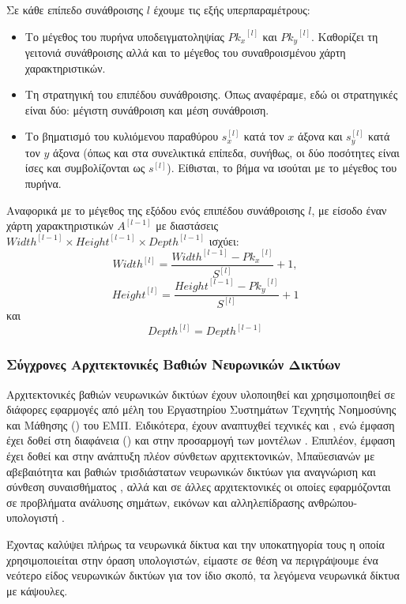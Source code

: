 Σε κάθε επίπεδο συνάθροισης $l$ έχουμε τις εξής υπερπαραμέτρους:
\begin{itemize}
  \item Το μέγεθος του πυρήνα υποδειγματοληψίας ${Pk_x}^{[l]}$ και ${Pk_y}^{[l]}$. Καθορίζει τη γειτονιά συνάθροισης αλλά και το μέγεθος του συναθροισμένου χάρτη χαρακτηριστικών.
  \item Τη στρατηγική του επιπέδου συνάθροισης. Όπως αναφέραμε, εδώ οι στρατηγικές είναι δύο: μέγιστη συνάθροιση και μέση συνάθροιση.
  \item Το βηματισμό του κυλιόμενου παραθύρου $s^{[l]}_x$ κατά τον $x$ άξονα και $s^{[l]}_y$ κατά τον $y$ άξονα (όπως και στα συνελικτικά επίπεδα, συνήθως, οι δύο ποσότητες είναι ίσες και συμβολίζονται ως $s^{[l]}$). Είθισται, το βήμα να ισούται με το μέγεθος του πυρήνα.
\end{itemize}

Αναφορικά με το μέγεθος της εξόδου ενός επιπέδου συνάθροισης $l$, με είσοδο έναν χάρτη χαρακτηριστικών $A^{[l-1]}$ με διαστάσεις ${Width}^{[l-1]} \times {Height}^{[l-1]}\times{Depth}^{[l-1]}$ ισχύει:
\begin{equation}
  {Width}^{[l]}= \frac{{Width}^{[l-1]}-{Pk_x}^{[l]}}{S^{[l]}} + 1,
  \end{equation}
  \begin{equation}
    {Height}^{[l]}=\frac{{Height}^{[l-1]}-{Pk_y}^{[l]}}{S^{[l]}} + 1
  \end{equation}
  και
  \begin{equation}
    {Depth}^{[l]}={Depth}^{[l-1]}
  \end{equation}


\subsubsection{Σύγχρονες Αρχιτεκτονικές Βαθιών Νευρωνικών Δικτύων}

Αρχιτεκτονικές βαθιών νευρωνικών δικτύων έχουν υλοποιηθεί και  χρησιμοποιηθεί σε διάφορες εφαρμογές από μέλη του Εργαστηρίου Συστημάτων Τεχνητής Νοημοσύνης και Μάθησης () του ΕΜΠ. Ειδικότερα, έχουν αναπτυχθεί τεχνικές  και  \cite{kollias2018deep,kol2019predicting,arsenos2022large}, ενώ έμφαση έχει δοθεί στη διαφάνεια () και στην προσαρμογή των μοντέλων \cite{kollias2017adaptation,kollias2020deep5,kollias2020transparent}. Επιπλέον, έμφαση έχει δοθεί και στην ανάπτυξη πλέον σύνθετων αρχιτεκτονικών, Μπαϋεσιανών  με αβεβαιότητα και βαθιών τρισδιάστατων νευρωνικών δικτύων για αναγνώριση και σύνθεση συναισθήματος \cite{de2020deep,psaroudakis2022mixaugment,refsk10,kollias2020va,caridakis10synthesizing}, αλλά και σε άλλες αρχιτεκτονικές οι οποίες εφαρμόζονται σε προβλήματα ανάλυσης σημάτων, εικόνων και αλληλεπίδρασης ανθρώπου-υπολογιστή \cite{alhnaity2021autoencoder,mylonas2009using,kollias1991unified,tzouveli2008adaptive}. 
\par
Έχοντας καλύψει πλήρως τα νευρωνικά δίκτυα και την υποκατηγορία τους η οποία χρησιμοποιείται στην όραση υπολογιστών, είμαστε σε θέση να περιγράψουμε ένα νεότερο είδος νευρωνικών δικτύων για τον ίδιο σκοπό, τα λεγόμενα νευρωνικά δίκτυα με κάψουλες.

